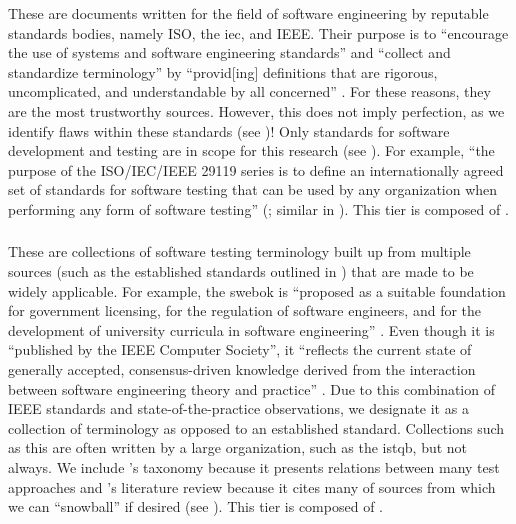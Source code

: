 These are documents written for the field of software engineering by reputable
standards bodies, namely ISO, the \acf{iec}, and IEEE. Their purpose is to
``encourage the use of systems and software engineering standards'' and
``collect and standardize terminology'' by ``provid[ing] definitions that are
rigorous, uncomplicated, and understandable by all concerned''
\citep[p.~viii]{IEEE2017}. For these reasons, they
are the most trustworthy sources. However, this does not imply perfection, as we
identify  %
flaws within these standards (see )!
Only standards for software development and testing are in scope for
this research (see ). For example, ``the purpose of the
ISO/IEC/IEEE 29119 series is to define an internationally agreed set of
standards for software testing that can be used by any organization when
performing any form of software testing''
\ifnotpaper(\fi\citeyear[p.~vii]{IEEE2022}\ifnotpaper; similar in
\citeyear[p.~ix]{IEEE2016})\fi.
This tier is composed of .

\subsubsection{}
\label{metas}

These are collections of software testing terminology built up from multiple
sources (such as the established standards outlined in ) that are
made to be widely applicable. For example, the \acs{swebok} is ``proposed as a
suitable foundation for government licensing, for the regulation of software
engineers, and for the development of university curricula in software
engineering'' \citep[p.~xix]{KanerEtAl2011}. Even though it is ``published by
the IEEE Computer Society'', it ``reflects the current state of generally
accepted, consensus-driven knowledge derived from the interaction between
software engineering theory and practice'' \citep{AboutSWEBOK}. Due to this
combination of IEEE standards and state-of-the-practice observations, we
designate it as a collection of terminology as opposed to an established
standard. Collections such as this are often written by a large
organization, such as the \acf{istqb}, but not always. We include
\citeauthor{Firesmith2015}'s taxonomy
\citeyearpar{Firesmith2015} because it presents relations between many test
approaches and \citeauthor{DoğanEtAl2014}'s
literature review \citeyearpar{DoğanEtAl2014} because it cites many
of sources from which we can ``snowball'' if desired (see ).
This tier is composed of .

